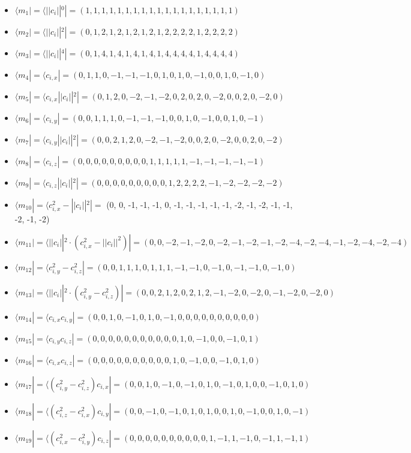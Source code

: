 \begin{itemize}
 \item $ \langle m_1 | =  \langle ||c_i||^0 | = (1,1,1,1,1,1,1,1,1,1,1,1,1,1,1,1,1,1,1)$ 
 \item $ \langle m_2 | =  \langle ||c_i||^2 | = (0,1,2,1,2,1,2,1,2,1,2,2,2,2,1,2,2,2,2)$
 \item $ \langle m_3 | =  \langle ||c_i||^4 | = (0,1,4,1,4,1,4,1,4,1,4,4,4,4,1,4,4,4,4)$
 \item $ \langle m_4 | =  \langle c_{i,x} | = (0,1,1,0,-1,-1,-1,0,1,0,1,0,-1,0,0,1,0,-1,0)$
 \item $ \langle m_5 | =  \langle c_{i,x} ||c_i||^2 | = (0,1,2,0,-2,-1,-2,0,2,0,2,0,-2,0,0,2,0,-2,0)$
 \item $ \langle m_6 | =  \langle c_{i,y} | = (0,0,1,1,1,0,-1,-1,-1,0,0,1,0,-1,0,0,1,0,-1)$
 \item $ \langle m_7 | =  \langle c_{i,y} ||c_i||^2 | = (0,0,2,1,2,0,-2,-1,-2,0,0,2,0,-2,0,0,2,0,-2)$
 \item $ \langle m_8 | =  \langle c_{i,z} | = (0,0,0,0,0,0,0,0,0,1,1,1,1,1,-1,-1,-1,-1,-1)$
 \item $ \langle m_9 | =  \langle c_{i,z} ||c_i||^2 | = (0,0,0,0,0,0,0,0,0,1,2,2,2,2,-1,-2,-2,-2,-2)$
 \item $ \langle m_{10} | =  \langle c^2_{i,x} - ||c_i||^2 | =$ (0, 0, -1, -1, -1, 0, -1, -1, -1, -1, -1, -2, -1, -2, -1, -1, -2, -1, -2)
 \item $ \langle m_{11} | =  \langle ||c_i||^2 \cdot (c^2_{i,x} - ||c_i||^2) | = (0,0,-2,-1,-2,0,-2,-1,-2,-1,-2,-4,-2,-4,-1,-2,-4,-2,-4)$
 \item $ \langle m_{12} | =  \langle c^2_{i,y} - c^2_{i,z} | = (0,0,1,1,1,0,1,1,1,-1,-1,0,-1,0,-1,-1,0,-1,0)$
 \item $ \langle m_{13} | =  \langle ||c_i||^2 \cdot (c^2_{i,y} - c^2_{i,z}) | = (0,0,2,1,2,0,2,1,2,-1,-2,0,-2,0,-1,-2,0,-2,0)$
 \item $ \langle m_{14} | =  \langle c_{i,x} c_{i,y}  | = (0,0,1,0,-1,0,1,0,-1,0,0,0,0,0,0,0,0,0,0)$
 \item $ \langle m_{15} | =  \langle c_{i,y} c_{i,z}  | = (0,0,0,0,0,0,0,0,0,0,0,1,0,-1,0,0,-1,0,1)$
 \item $ \langle m_{16} | =  \langle c_{i,x} c_{i,z}  | = (0,0,0,0,0,0,0,0,0,0,1,0,-1,0,0,-1,0,1,0)$
 \item $ \langle m_{17} | =  \langle (c^2_{i,y} - c^2_{i,z}) c_{i,x}   | = (0,0,1,0,-1,0,-1,0,1,0,-1,0,1,0,0,-1,0,1,0)$
 \item $ \langle m_{18} | =  \langle (c^2_{i,z} - c^2_{i,x}) c_{i,y}   | = (0,0,-1,0,-1,0,1,0,1,0,0,1,0,-1,0,0,1,0,-1)$
 \item $ \langle m_{19} | =  \langle (c^2_{i,x} - c^2_{i,y}) c_{i,z}   | = (0,0,0,0,0,0,0,0,0,0,1,-1,1,-1,0,-1,1,-1,1)$
\end{itemize}
